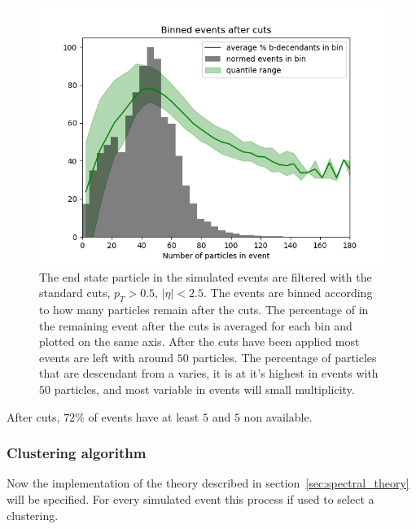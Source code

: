 \begin{figure}[htp]
    \begin{minipage}[c]{0.5\textwidth}
        \includegraphics[width=1\textwidth]{graphics/binned_events.png}
    \end{minipage}\hfill
    \begin{minipage}[c]{0.45\textwidth}
        \caption{The end state particle in the simulated events are filtered
            with the standard cuts, \(p_T > 0.5\), \(|\eta| < 2.5\).
            The events are binned according to how many particles remain after the cuts.
            The percentage of  in the remaining event after the cuts
            is averaged for each bin and plotted on the same axis.
            After the cuts have been applied most events are left with around \(50\) particles.
                 The percentage of particles that are descendant from a  varies,
                 it is at it's highest in events with \(50\) particles,
             and most variable in events will small multiplicity.}
    \end{minipage}
\end{figure}    

After cuts, \(72\%\) of events have at least \(5\)  and \(5\) non  available.

\subsubsection{Clustering algorithm}\label{sec:spectralmethodalgo}
Now the implementation of the theory described in section~\ref{sec:spectral_theory} will be specified.
For every simulated event this process if used to select a clustering.

